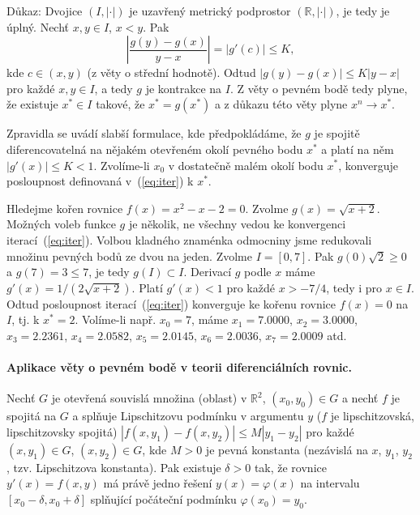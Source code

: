 Důkaz: Dvojice $(I,|\cdot|)$ je uzavřený metrický podprostor $(\mathbb{R},|\cdot|)$,
je tedy je úplný. Nechť $x,y\in I$, $x<y$. Pak
\[
   \left|\frac{g(y) - g(x)}{y-x}\right| = |g'(c)| \leq K,
\]
kde $c\in(x,y)$ (z věty o střední hodnotě).
Odtud $|g(y) - g(x)| \leq K|y-x|$ pro každé $x,y\in I$,
a tedy $g$ je kontrakce na $I$.
Z věty o pevném bodě tedy plyne, že existuje $x^*\in I$ takové,
že $x^*=g(x^*)$ a z důkazu této věty plyne $x^n\rightarrow x^*$.

Zpravidla se uvádí slabší formulace, kde předpokládáme, že $g$
je spojitě diferencovatelná na nějakém otevřeném okolí pevného bodu $x^*$
a platí na něm $|g'(x)|\leq K<1$. Zvolíme-li $x_0$ v dostatečně malém okolí
bodu $x^*$, konverguje posloupnost definovaná v~(\ref{eq:iter}) k $x^*$.

\begin{ex}
   Hledejme kořen rovnice $f(x)=x^2-x-2=0$.
   Zvolme $g(x)=\sqrt{x+2}$. 
   Možných voleb funkce $g$ je několik,
   ne všechny vedou ke konvergenci iterací~(\ref{eq:iter}).
   Volbou kladného znaménka odmocniny jsme redukovali množinu pevných bodů
   ze dvou na jeden.
   Zvolme $I=[0,7]$. Pak $g(0)\sqrt{2}\geq 0$ a $g(7)=3\leq 7$,
   je tedy $g(I)\subset I$.
   Derivací $g$ podle $x$ máme $g'(x)=1/(2\sqrt{x+2})$.
   Platí $g'(x)<1$ pro každé $x>-7/4$, tedy i pro $x\in I$.
   Odtud posloupnost iterací~(\ref{eq:iter}) konverguje ke kořenu
   rovnice $f(x)=0$ na $I$, tj. k $x^*=2$.
   Volíme-li např. $x_0=7$, máme
   $x_1=7.0000$, $x_2=3.0000$, $x_3=2.2361$, $x_4=2.0582$,
   $x_5=2.0145$, $x_6=2.0036$, $x_7=2.0009$ atd.
\end{ex}

\paragraph{Aplikace věty o pevném bodě v teorii diferenciálních rovnic.}
Nechť $G$ je otevřená souvislá množina (oblast) v $\mathbb{R}^2$,
$(x_0,y_0)\in G$ a nechť $f$ je spojitá na $G$ 
a splňuje Lipschitzovu podmínku v argumentu $y$
($f$ je lipschitzovská, lipschitzovsky spojitá)
$|f(x,y_1)-f(x,y_2)|\leq M|y_1-y_2|$ pro každé $(x,y_1)\in G$, $(x,y_2)\in G$,
kde $M>0$ je pevná konstanta (nezávislá na $x$, $y_1$, $y_2$,
tzv. Lipschitzova konstanta).
Pak existuje $\delta > 0$ tak, že rovnice $y'(x) = f(x,y)$ má právě jedno řešení
$y(x)=\varphi(x)$ na intervalu $[x_0-\delta,x_0+\delta]$ splňující
počáteční podmínku $\varphi(x_0)=y_0$.

